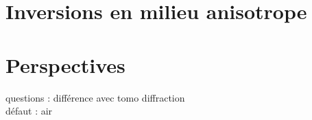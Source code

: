 \documentclass[10pt,xcolor=x11names,compress, notes=show]{beamer}%
\begin{document}
\section{Inversions en milieu anisotrope}


\section{Perspectives}












\begin{frame}[allowframebreaks]{}

	\begin{adjustwidth}{-2em}{-2.5em}
		\scriptsize
		
		
	\end{adjustwidth}
\end{frame}

\begin{frame}
	questions : différence avec tomo diffraction\\
	défaut : air
\end{frame}
\end{document}
